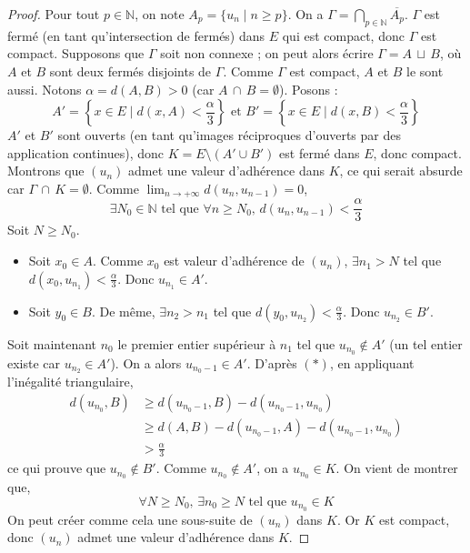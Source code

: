 	\begin{proof}
		Pour tout $p \in \mathbb{N}$, on note $A_p = \{u_n \mid n\geq p\}$. On a $\Gamma = \bigcap_{p \in \mathbb{N}} \overline{A_p}$. $\Gamma$ est fermé (en tant qu'intersection de fermés) dans $E$ qui est compact, donc $\Gamma$ est compact.
		Supposons que $\Gamma$ soit non connexe ; on peut alors écrire $\Gamma = A \, \sqcup \, B$, où $A$ et $B$ sont deux fermés disjoints de $\Gamma$. Comme $\Gamma$ est compact, $A$ et $B$ le sont aussi. Notons $\alpha = d(A, B) > 0$ (car $A \, \cap \, B = \emptyset$). Posons :
		\[
		A'= \left \{ x \in E \mid d(x, A) < \frac{\alpha}{3} \right \} \text{ et } B'= \left \{ x \in E \mid d(x, B) < \frac{\alpha}{3} \right \}
		\]
		$A'$ et $B'$ sont ouverts (en tant qu'images réciproques d'ouverts par des application continues), donc $K = E \setminus (A'\cup B')$ est fermé dans $E$, donc compact.
		\newpar
		Montrons que $(u_n)$ admet une valeur d'adhérence dans $K$, ce qui serait absurde car $\Gamma \, \cap \, K = \emptyset$. Comme $\lim_{n \rightarrow +\infty} d(u_n, u_{n-1})=0$,
		\[ \exists N_0 \in \mathbb{N} \text{ tel que } \forall n \geq N_0, \, d(u_n, u_{n-1}) < \frac{\alpha}{3} \tag{$*$} \]
		Soit $N \geq N_0$.
		\begin{itemize}
			\item Soit $x_0 \in A$. Comme $x_0$ est valeur d'adhérence de $(u_n)$, $\exists n_1 > N$ tel que $d(x_0, u_{n_1}) < \frac{\alpha}{3}$. Donc $u_{n_1} \in A'$.
			\item Soit $y_0 \in B$. De même, $\exists n_2 > n_1$ tel que $d(y_0, u_{n_2}) < \frac{\alpha}{3}$. Donc $u_{n_2} \in B'$.
		\end{itemize}
		Soit maintenant $n_0$ le premier entier supérieur à $n_1$ tel que $u_{n_0} \notin A'$ (un tel entier existe car $u_{n_2} \in A'$). On a alors $u_{n_0 - 1} \in A'$.
		D'après $(*)$, en appliquant l'inégalité triangulaire,
		\begin{align*}
			d(u_{n_0}, B) & \geq d(u_{n_0 - 1}, B) - d(u_{n_0 - 1}, u_{n_0})           \\
			& \geq d(A, B) - d(u_{n_0 - 1}, A) - d(u_{n_0 - 1}, u_{n_0}) \\
			& > \frac{\alpha}{3}
		\end{align*}
		ce qui prouve que $u_{n_0} \notin B'$. Comme $u_{n_0} \notin A'$, on a $u_{n_0} \in K$. On vient de montrer que,
		\[ \forall N \geq N_0, \, \exists n_0 \geq N \text{ tel que } u_{n_0} \in K \]
		On peut créer comme cela une sous-suite de $(u_n)$ dans $K$. Or $K$ est compact, donc $(u_n)$ admet une valeur d'adhérence dans $K$.
	\end{proof}

